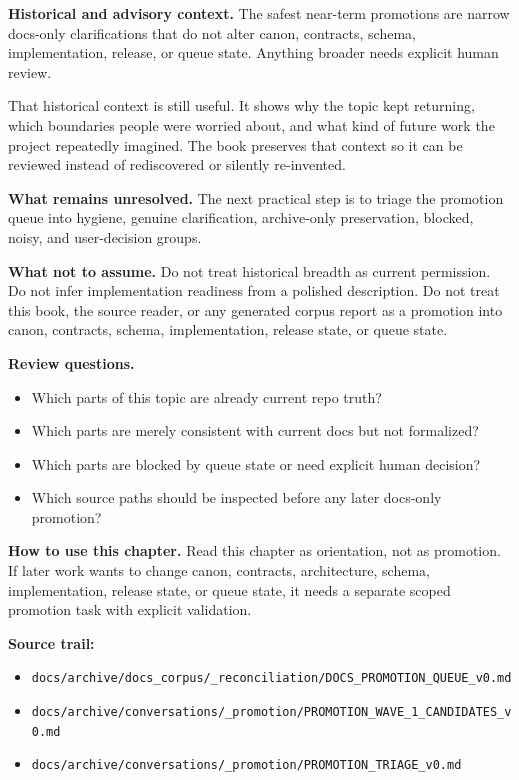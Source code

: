 \documentclass[10.5pt,a4paper,openany]{book}
\begin{document}
\textbf{Historical and advisory context.} The safest near-\allowbreak{}term promotions are narrow docs-\allowbreak{}only clarifications that do not alter canon, contracts, schema, implementation, release, or queue state.\allowbreak{} Anything broader needs explicit human review.\allowbreak{}


That historical context is still useful.\allowbreak{} It shows why the topic kept returning, which boundaries people were worried about, and what kind of future work the project repeatedly imagined.\allowbreak{} The book preserves that context so it can be reviewed instead of rediscovered or silently re-\allowbreak{}invented.\allowbreak{}


\textbf{What remains unresolved.} The next practical step is to triage the promotion queue into hygiene, genuine clarification, archive-\allowbreak{}only preservation, blocked, noisy, and user-\allowbreak{}decision groups.\allowbreak{}


\textbf{What not to assume.} Do not treat historical breadth as current permission.\allowbreak{} Do not infer implementation readiness from a polished description.\allowbreak{} Do not treat this book, the source reader, or any generated corpus report as a promotion into canon, contracts, schema, implementation, release state, or queue state.\allowbreak{}


\textbf{Review questions.}


\begin{itemize}
\item Which parts of this topic are already current repo truth?
\item Which parts are merely consistent with current docs but not formalized?
\item Which parts are blocked by queue state or need explicit human decision?
\item Which source paths should be inspected before any later docs-\allowbreak{}only promotion?
\end{itemize}

\textbf{How to use this chapter.} Read this chapter as orientation, not as promotion.\allowbreak{} If later work wants to change canon, contracts, architecture, schema, implementation, release state, or queue state, it needs a separate scoped promotion task with explicit validation.\allowbreak{}


\textbf{Source trail:}


\begin{itemize}
\item \texttt{docs/\allowbreak{}archive/\allowbreak{}docs\_\allowbreak{}corpus/\allowbreak{}\_\allowbreak{}reconciliation/\allowbreak{}DOCS\_\allowbreak{}PROMOTION\_\allowbreak{}QUEUE\_\allowbreak{}v0.\allowbreak{}md}
\item \texttt{docs/\allowbreak{}archive/\allowbreak{}conversations/\allowbreak{}\_\allowbreak{}promotion/\allowbreak{}PROMOTION\_\allowbreak{}WAVE\_\allowbreak{}1\_\allowbreak{}CANDIDATES\_\allowbreak{}v0.\allowbreak{}md}
\item \texttt{docs/\allowbreak{}archive/\allowbreak{}conversations/\allowbreak{}\_\allowbreak{}promotion/\allowbreak{}PROMOTION\_\allowbreak{}TRIAGE\_\allowbreak{}v0.\allowbreak{}md}
\end{itemize}
\end{document}
